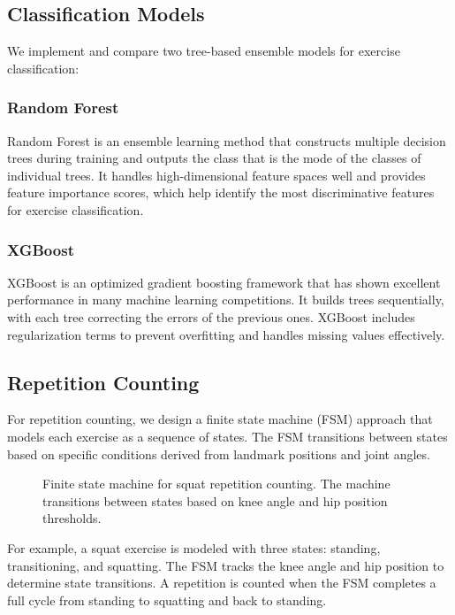 \documentclass[conference]{IEEEtran}
\begin{document}
\subsection{Classification Models}
We implement and compare two tree-based ensemble models for exercise classification:

\subsubsection{Random Forest}
Random Forest \cite{rf} is an ensemble learning method that constructs multiple decision trees during training and outputs the class that is the mode of the classes of individual trees. It handles high-dimensional feature spaces well and provides feature importance scores, which help identify the most discriminative features for exercise classification.

\subsubsection{XGBoost}
XGBoost \cite{xgboost} is an optimized gradient boosting framework that has shown excellent performance in many machine learning competitions. It builds trees sequentially, with each tree correcting the errors of the previous ones. XGBoost includes regularization terms to prevent overfitting and handles missing values effectively.

\subsection{Repetition Counting}
For repetition counting, we design a finite state machine (FSM) approach that models each exercise as a sequence of states. The FSM transitions between states based on specific conditions derived from landmark positions and joint angles.

\begin{figure}[ht]
\centering

\caption{Finite state machine for squat repetition counting. The machine transitions between states based on knee angle and hip position thresholds.}
\label{fig:fsm_diagram}
\end{figure}

For example, a squat exercise is modeled with three states: standing, transitioning, and squatting. The FSM tracks the knee angle and hip position to determine state transitions. A repetition is counted when the FSM completes a full cycle from standing to squatting and back to standing.
\end{document}
